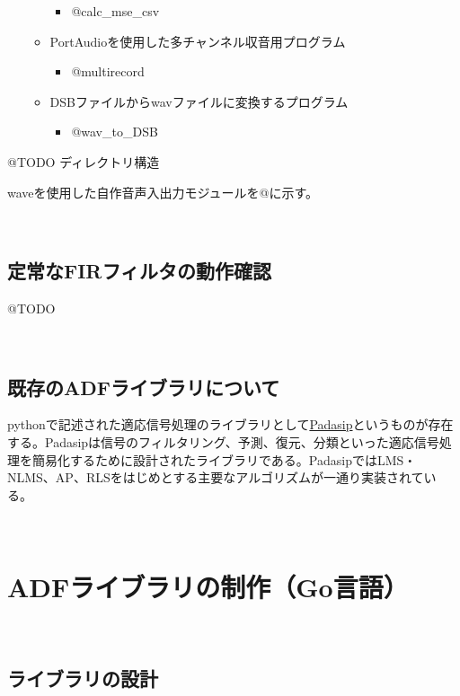 \begin{itemize}
\begin{itemize}
    \begin{itemize}
    \tightlist
    \item
      @calc\_mse\_csv
    \end{itemize}
  \item
    PortAudioを使用した多チャンネル収音用プログラム

    \begin{itemize}
    \tightlist
    \item
      @multirecord
    \end{itemize}
  \item
    DSBファイルからwavファイルに変換するプログラム

    \begin{itemize}
    \tightlist
    \item
      @wav\_to\_DSB
    \end{itemize}
  \end{itemize}
\end{itemize}

@TODO ディレクトリ構造

waveを使用した自作音声入出力モジュールを@に示す。

\
\subsection{定常なFIRフィルタの動作確認}\label{ux5b9aux5e38ux306afirux30d5ux30a3ux30ebux30bfux306eux52d5ux4f5cux78baux8a8d}

@TODO

\
\subsection{既存のADFライブラリについて}\label{ux65e2ux5b58ux306eadfux30e9ux30a4ux30d6ux30e9ux30eaux306bux3064ux3044ux3066}

pythonで記述された適応信号処理のライブラリとして\href{https://matousc89.github.io/padasip/index.html\#padasip}{Padasip}というものが存在する。Padasipは信号のフィルタリング、予測、復元、分類といった適応信号処理を簡易化するために設計されたライブラリである。PadasipではLMS・NLMS、AP、RLSをはじめとする主要なアルゴリズムが一通り実装されている。

\
\section{ADFライブラリの制作（Go言語）}\label{adfux30e9ux30a4ux30d6ux30e9ux30eaux306eux5236ux4f5cgoux8a00ux8a9e}

\
\subsection{ライブラリの設計}\label{ux30e9ux30a4ux30d6ux30e9ux30eaux306eux8a2dux8a08}

